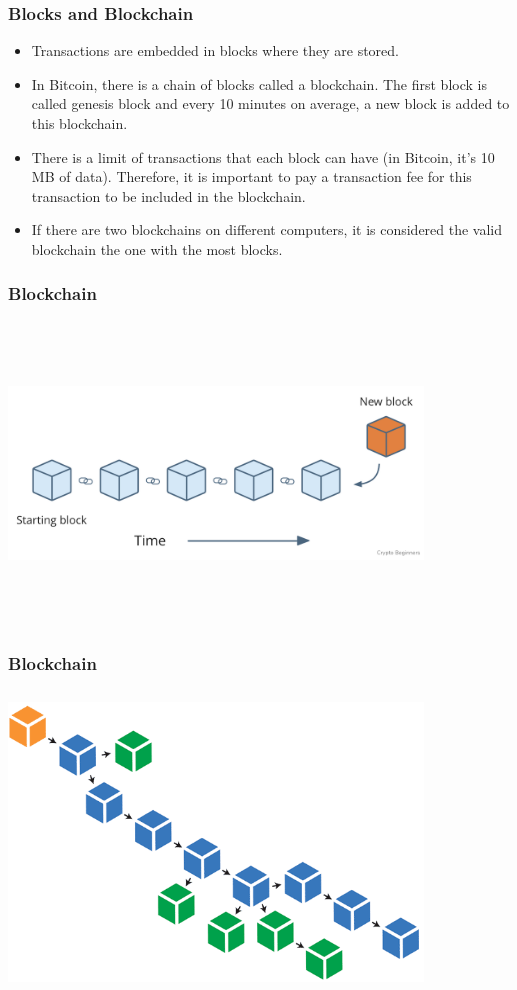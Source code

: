 \documentclass{beamer}
\begin{document}
\begin{frame}
   \frametitle{Blocks and Blockchain}
   \begin{itemize}
     \item Transactions are embedded in blocks where they are stored.
     \item In Bitcoin, there is a chain of blocks called a blockchain.
       The first block is called genesis block and
       every 10 minutes on average, a new block is added to this blockchain.
     \item There is a limit of transactions that each block can have (in Bitcoin, it's 10 MB of data).
       Therefore, it is important to pay a transaction fee for this transaction to be included in the
       blockchain.
     \item If there are two blockchains on different computers, it is considered
       the valid blockchain the one with the most blocks.
   \end{itemize}
\end{frame}

\begin{frame}
\frametitle{Blockchain}
\includegraphics[width=11cm, height=8cm]{blockchain1}
\end{frame}

\begin{frame}
\frametitle{Blockchain}
\includegraphics[width=11cm, height=8cm]{blockchain2}
\end{frame}
\end{document}
